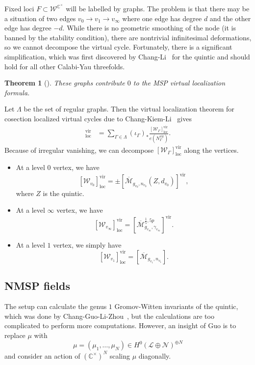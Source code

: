 \documentclass[10pt,oldfontcommands,oneside]{memoir}
\newtheorem{thm}{Theorem}[section]
\theoremstyle{definition}
\theoremstyle{remark}
\theoremstyle{plain}
\theoremstyle{definition}
\theoremstyle{remark}
\newcommand{\C}{\mathbb{C}}
\newcommand{\Mbar}{\overline{\mathcal{M}}}
\newcommand{\mc}[1]{\mathcal{#1}}
\newcommand{\mr}[1]{\mathrm{#1}}
\newcommand{\1}{\mathbf{1}}
\newcommand{\2}{\mathbf{2}}
\newcommand{\3}{\mathbf{3}}
\newcommand{\vir}{\mr{vir}}
\begin{document}
Fixed loci $F \subset \mc{W}^{\C^{\times}}$ will be labelled by graphs. The problem is that there may be a situation of two edges $v_0 \to v_1 \to v_{\infty}$ where one edge has degree $d$ and the other edge has degree $-d$. While there is no geometric smoothing of the node (it is banned by the stability condition), there are nontrivial infinitesimal deformations, so we cannot decompose the virtual cycle. Fortunately, there is a significant simplification, which was first discovered by Chang-Li~\cite{msp3} for the quintic and should hold for all other Calabi-Yau threefolds.

\begin{thm}[\cite{msp3}]
    These graphs contribute $0$ to the MSP virtual localization formula.
\end{thm}

Let $\Lambda$ be the set of regular graphs. Then the virtual localization theorem for cosection localized virtual cycles due to Chang-Kiem-Li~\cite{locwccosection} gives
\begin{align*}
    [\mc{W}]^{\vir}_{\mr{loc}} &= \sum_{\Gamma \in \Lambda} (\iota_{\Gamma})_* \frac{[\mc{W}_{\Gamma}]^{\vir}_{\mr{loc}}}{e(N_{\Gamma}^{\vir})}.
\end{align*}
Because of irregular vanishing, we can decompose $[\mc{W}_{\Gamma}]^{\vir}_{\mr{loc}}$ along the vertices.

\begin{itemize}
    \item At a level $0$ vertex, we have
        \[ [\mc{W}_{v_0}]_{\mr{loc}}^{\vir} = \pm [\Mbar_{g_{v_0}, n_{v_0}}(Z, d_{v_0})]^{\vir}, \]
        where $Z$ is the quintic.
    \item At a level $\infty$ vertex, we have
        \[ [\mc{W}_{v_{\infty}}]_{\mr{loc}}^{\vir} = [\Mbar_{g_{v_{\infty}}, \gamma_{v_{\infty}}}^{\frac{1}{5},5p}]^{\vir}. \]
    \item At a level $1$ vertex, we simply have
        \[ [\mc{W}_{v_1}]_{\mr{loc}}^{\vir} = [\Mbar_{g_{v_1}, n_{v_1}}]. \]
\end{itemize}


\subsection{NMSP fields}%
\label{sub:NMSP fields}

The setup can calculate the genus $1$ Gromov-Witten invariants of the quintic, which was done by Chang-Guo-Li-Zhou~\cite{genusonemsp}, but the calculations are too complicated to perform more computations. However, an insight of Guo is to replace $\mu$ with
\[ \mu = (\mu_1, \ldots, \mu_N) \in H^0(\mc{L}\oplus \mc{N})^{\oplus N} \]
and consider an action of $(\C^{\times})^N$ scaling $\mu$ diagonally.
\end{document}
